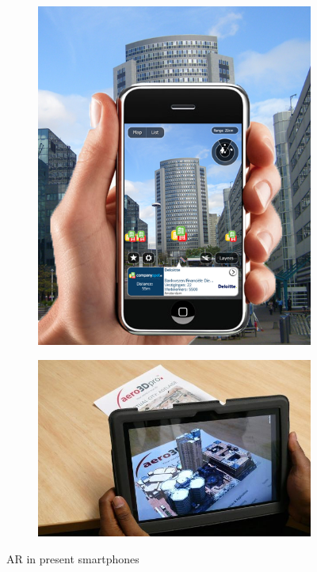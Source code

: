 \documentclass[12pt,twocolumn,letterpaper]{article}
\begin{document}
\begin{figure}
\begin{subfigure}{0.2\textwidth}
\includegraphics[scale=0.16]{images/AR_now}
\end{subfigure}
\begin{subfigure}{0.2\textwidth}
\includegraphics[scale=0.22]{images/AR_now1}
\end{subfigure}
\caption{AR in present smartphones}
\label{pic:arnow}
\end{figure}
     
\end{document}
